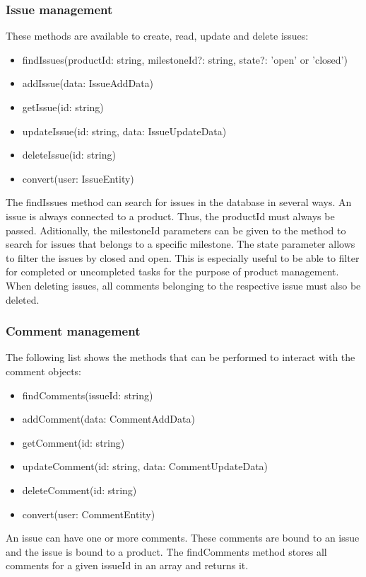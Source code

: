     \subsubsection*{Issue management} 
    These methods are available to create, read, update and delete issues:
    \begin{itemize}
        \item findIssues(productId: string, milestoneId?: string, state?: 'open' or 'closed')
        \item addIssue(data: IssueAddData)
        \item getIssue(id: string)
        \item updateIssue(id: string, data: IssueUpdateData)
        \item deleteIssue(id: string)
        \item convert(user: IssueEntity)
    \end{itemize}
    The findIssues method can search for issues in the database in several ways. An issue is always connected to a product. Thus, the productId must always be passed. Aditionally, the milestoneId parameters can be given to the method to search for issues that belongs to a specific milestone. The state parameter allows to filter the issues by closed and open. This is especially useful to be able to filter for completed or uncompleted tasks for  the purpose of product management. When deleting issues, all comments belonging to the respective issue must also be deleted.

    \subsubsection*{Comment management}
    The following list shows the methods that can be performed to interact with the comment objects:
    \begin{itemize}
        \item findComments(issueId: string)
        \item addComment(data: CommentAddData)
        \item getComment(id: string)
        \item updateComment(id: string, data: CommentUpdateData)
        \item deleteComment(id: string)
        \item convert(user: CommentEntity)
    \end{itemize}
    An issue can have one or more comments. These comments are bound to an issue and the issue is bound to a product. The findComments method stores all comments for a given issueId in an array and returns it. 

